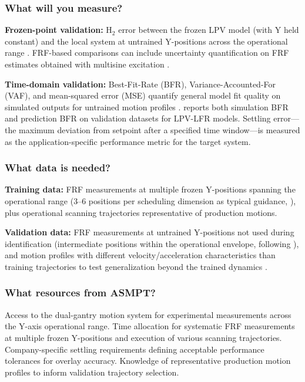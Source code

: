 \subsubsection{What will you measure?}

\textbf{Frozen-point validation:} H$_2$ error between the frozen LPV model (with Y held constant) and the local system at untrained Y-positions across the operational range \citep{bachnas2014review}. FRF-based comparisons can include uncertainty quantification on FRF estimates obtained with multisine excitation \citep{gonzalez2025finite}.

\textbf{Time-domain validation:} Best-Fit-Rate (BFR), Variance-Accounted-For (VAF), and mean-squared error (MSE) quantify general model fit quality on simulated outputs for untrained motion profiles \citep{toth2010modeling, bachnas2014review}. \citet{drenth2025efficient} reports both simulation BFR and prediction BFR on validation datasets for LPV-LFR models. Settling error---the maximum deviation from setpoint after a specified time window---is measured as the application-specific performance metric for the target system.

\subsubsection{What data is needed?}

\textbf{Training data:} FRF measurements at multiple frozen Y-positions spanning the operational range (3--6 positions per scheduling dimension as typical guidance, \citet{bachnas2014review}), plus operational scanning trajectories representative of production motions.

\textbf{Validation data:} FRF measurements at untrained Y-positions not used during identification (intermediate positions within the operational envelope, following \citet{paijmans2008identification}), and motion profiles with different velocity/acceleration characteristics than training trajectories to test generalization beyond the trained dynamics \citep{toth2010modeling}.

\subsubsection{What resources from ASMPT?}

Access to the dual-gantry motion system for experimental measurements across the Y-axis operational range. Time allocation for systematic FRF measurements at multiple frozen Y-positions and execution of various scanning trajectories. Company-specific settling requirements defining acceptable performance tolerances for overlay accuracy. Knowledge of representative production motion profiles to inform validation trajectory selection.

